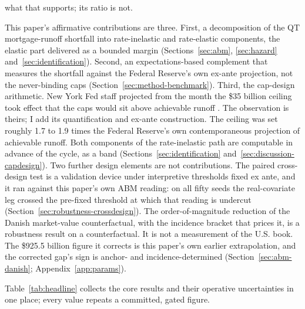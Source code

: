 \documentclass[12pt]{article}
\begin{document}
what that supports; its ratio is not.

This paper's affirmative contributions are three. First, a decomposition of the QT mortgage-runoff shortfall into rate-inelastic and rate-elastic components, the elastic part delivered as a bounded margin (Sections~\ref{sec:abm}, \ref{sec:hazard} and~\ref{sec:identification}). Second, an expectations-based complement that measures the shortfall against the Federal Reserve's own ex-ante projection, not the never-binding caps (Section~\ref{sec:method-benchmark}). Third, the cap-design arithmetic. New York Fed staff projected from the month the \$35 billion ceiling took effect that the caps would sit above achievable runoff \citep{nyfed2022}. The observation is theirs; I add its quantification and ex-ante construction. The ceiling was set roughly 1.7 to 1.9 times the Federal Reserve's own contemporaneous projection of achievable runoff. Both components of the rate-inelastic path are computable in advance of the cycle, as a band (Sections~\ref{sec:identification} and~\ref{sec:discussion-capdesign}). Two further design elements are not contributions. The paired cross-design test is a validation device under interpretive thresholds fixed ex ante, and it ran against this paper's own ABM reading: on all fifty seeds the real-covariate leg crossed the pre-fixed threshold at which that reading is undercut (Section~\ref{sec:robustness-crossdesign}). The order-of-magnitude reduction of the Danish market-value counterfactual, with the incidence bracket that prices it, is a robustness result on a counterfactual. It is not a measurement of the U.S. book. The \$925.5 billion figure it corrects is this paper's own earlier extrapolation, and the corrected gap's sign is anchor- and incidence-determined (Section~\ref{sec:abm-danish}; Appendix~\ref{app:params}).

Table~\ref{tab:headline} collects the core results and their operative uncertainties in one place; every value repeats a committed, gated figure.
\end{document}
